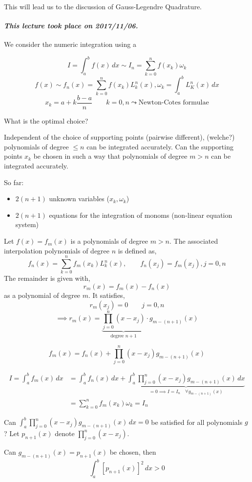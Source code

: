 \documentclass{article}
\newcommand{\dateref}[1]{\paragraph{\textit{This lecture took place on #1.}}}
\begin{document}
This will lead us to the discussion of Gauss-Legendre Quadrature.


\dateref{2017/11/06}

We consider the numeric integration using a 

\[ I = \int_a^b f(x) \, dx \sim I_n = \sum_{k=0}^n f(x_k) \omega_k  \]
\[ f(x) \sim{} f_n(x) = \sum_{k=0}^n f(x_k) L_k^n(x), \omega_k = \int_a^b L_K^n(x) \, dx \]
\[ x_k = a + k \frac{b - a}{n} \qquad k = 0, n \leadsto \text{Newton-Cotes formulae} \]

What is the optimal choice?

Independent of the choice of supporting points (pairwise different),
(welche?) polynomials of degree $\leq n$ can be integrated accurately.
Can the supporting points $x_k$ be chosen in such a way that polynomials of
degree $m > n$ can be integrated accurately.

So far:
\begin{itemize}
  \item $2(n+1)$ unknown variables ($x_k, \omega_k$)
  \item $2(n+1)$ equations for the integration of monoms (non-linear equation system)
\end{itemize}

Let $f(x) = f_m(x)$ is a polynomials of degree $m > n$.
The associated interpolation polynomials of degree $n$ is defined as,
\[ f_n(x) = \sum_{k=0}^n f_m(x_k) L_k^n(x), \qquad f_n(x_j) = f_m(x_j), j = 0,n \]
The remainder is given with,
\[ r_m(x) = f_m(x) - f_n(x) \]
as a polynomial of degree $m$. It satisfies,
\[ r_m(x_j) = 0 \qquad j=0,n \]
\[ \implies r_m(x) = \underbrace{\prod_{j=0}^n (x - x_j)}_{\text{degree } n + 1} \cdot g_{m - (n+1)}(x) \]

\[ f_m(x) = f_n(x) + \prod_{j=0}^n (x - x_j) g_{m - (n+1)}(x) \]

\begin{align*}
  I = \int_a^b f_m(x) \, dx &= \int_a^b f_n(x) \, dx + \underbrace{\int_a^b \prod_{j=0}^n (x - x_j) g_{m - (n+1)}(x) \, dx}_{=0 \implies I = I_n \quad \forall g_{m - (n+1)}(x)} \\
    &= \sum_{k=0}^n f_m(x_k) \omega_k = I_n
\end{align*}

Can $\int_a^b \prod_{j=0}^n (x - x_j) g_{m - (n+1)}(x) \, dx = 0$ be satisfied for all polynomials $g$?
Let $p_{n+1}(x)$ denote $\prod_{j=0}^n (x - x_j)$.

Can $g_{m - (n+1)}(x) = p_{n+1}(x)$ be chosen, then
\[ \int_a^b \left[p_{n+1}(x)\right]^2 \, dx > 0 \]
\end{document}
